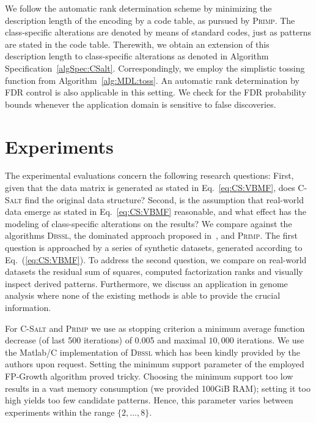 We follow the automatic rank determination scheme by minimizing the description length of the encoding by a code table, as pursued by \textsc{Primp}. The class-specific alterations are denoted by means of standard codes, just as patterns are stated in the code table. Therewith, we obtain an extension of this description length to class-specific alterations as denoted in Algorithm Specification~\ref{algSpec:CSalt}. Correspondingly, we employ the simplistic tossing function from Algorithm~\ref{alg:MDL:toss}. An automatic rank determination by FDR control is also applicable in this setting. We check for the FDR probability bounds whenever the application domain is sensitive to false discoveries.  
\section{Experiments}
The experimental evaluations concern the following research questions: First, given that the data matrix is generated as stated in Eq.~\eqref{eq:CS:VBMF}, does \textsc{C-Salt} find the original data structure?
Second, is the assumption that real-world data emerge as stated in Eq.~\eqref{eq:CS:VBMF} reasonable, and what effect has the modeling of class-specific alterations on the results?
We compare against the algorithms \textsc{Dbssl}, the dominated approach proposed in~\cite{miettienen2012finding}, and \textsc{Primp}.
The first question is approached by a series of synthetic datasets, generated according to Eq.~(\ref{eq:CS:VBMF}). To address the second question, we compare on real-world datasets the residual sum of squares, computed factorization ranks and visually inspect derived patterns.
Furthermore, we discuss an application in genome analysis where none of the existing methods is able to provide the crucial information.

For \textsc{C-Salt} and \textsc{Primp} we use as stopping criterion a minimum average function decrease (of last 500 iterations) of 0.005 and maximal $10,000$ iterations. We use the Matlab/C implementation of \textsc{Dbssl} which has been kindly provided by the authors upon request. Setting the minimum support parameter of the employed FP-Growth algorithm proved tricky. Choosing the minimum support too low results in a vast memory consumption (we provided 100GiB RAM); setting it too high yields too few candidate patterns. Hence, this parameter varies between experiments within the range $\{2,\ldots,8\}$.

